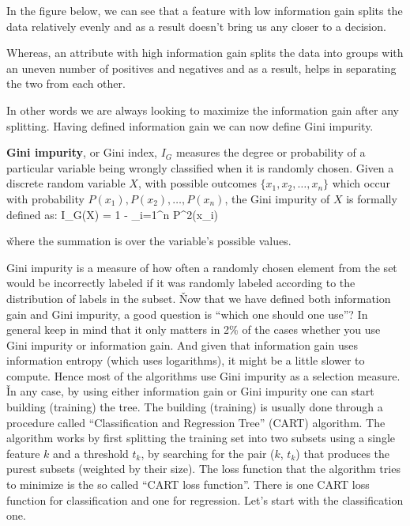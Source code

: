 In the figure below, we can see that a feature with low information gain splits the data relatively evenly and as a
result doesn't bring us any closer to a decision.


Whereas, an attribute with high information gain splits the data into groups with an uneven number of positives and
negatives and as a result, helps in separating the two from each other.


In other words we are always looking to maximize the information gain after any splitting. Having defined information
gain we can now define Gini impurity.

\textbf{Gini impurity}, or Gini index, $I_{G}$ measures the degree or probability of a particular variable being
wrongly classified when it is randomly chosen. Given a discrete random variable $X$, with possible outcomes $\{x_{1},
x_{2}, \ldots, x_{n} \}$ which occur with probability $ P(x_{1}), P(x_{2}), \ldots, P(x_{n})$, the Gini impurity of
$X$ is formally defined as:
\bse
I_{G}(X) = 1 - \sum _{i=1}^{n} P^2(x_{i})
\ese

\v

where the summation is over the variable's possible values.
\ed

Gini impurity is a measure of how often a randomly chosen element from the set would be incorrectly labeled if it was
randomly labeled according to the distribution of labels in the subset. \v

Now that we have defined both information gain and Gini impurity, a good question is ``which one should one use''? In
general keep in mind that it only matters in 2\% of the cases whether you use Gini impurity or information gain. And
given that information gain uses information entropy (which uses logarithms), it might be a little slower to compute.
Hence most of the algorithms use Gini impurity as a selection measure. \v

In any case, by using either information gain or Gini impurity one can start building (training) the tree. The
building (training) is usually done through a procedure called ``Classification and Regression Tree'' (CART) algorithm.
The algorithm works by first splitting the training set into two subsets using a single feature $k$ and a threshold
$t_k$, by searching for the pair ($k$, $t_k$) that produces the purest subsets (weighted by their size). The loss
function that the algorithm tries to minimize is the so called ``CART loss function''. There is one CART loss function
for classification and one for regression. Let's start with the classification one.

